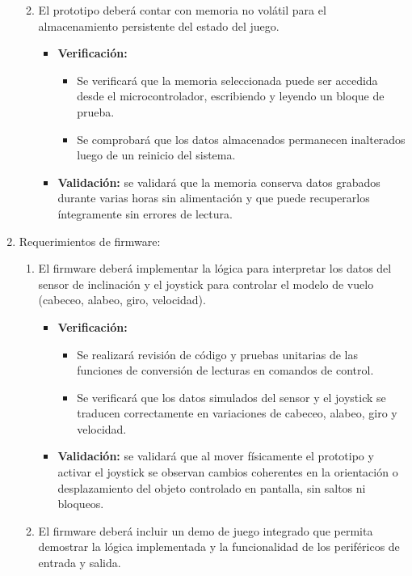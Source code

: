 \documentclass[
11pt, %
]{charter}
\begin{document}
\begin{enumerate}
\begin{enumerate}
\begin{itemize}
		\end{itemize}		
		\item El prototipo deberá contar con memoria no volátil para el almacenamiento persistente del estado del juego. %
		\begin{itemize}
			\item \textbf{Verificación:} 
			\begin{itemize}
				\item Se verificará que la memoria seleccionada puede ser accedida desde el microcontrolador, escribiendo y leyendo un bloque de prueba.                                     
				\item Se comprobará que los datos almacenados permanecen inalterados luego de un reinicio del sistema.
			\end{itemize}
			\item \textbf{Validación:} se validará que la memoria conserva datos grabados durante varias horas sin alimentación y que puede recuperarlos íntegramente sin errores de lectura.
		\end{itemize}	
	\end{enumerate}
	\item Requerimientos de firmware:
	\begin{enumerate}
		\item El firmware deberá implementar la lógica para interpretar los datos del sensor de inclinación y el joystick para controlar el modelo de vuelo (cabeceo, alabeo, giro, velocidad). %
		\begin{itemize}
			\item \textbf{Verificación:} 
			\begin{itemize}
				\item Se realizará revisión de código y pruebas unitarias de las funciones de conversión de lecturas en comandos de control.
				\item Se verificará que los datos simulados del sensor y el joystick se traducen correctamente en variaciones de cabeceo, alabeo, giro y velocidad.
			\end{itemize} 
			\item \textbf{Validación:} se validará que al mover físicamente el prototipo y activar el joystick se observan cambios coherentes en la orientación o desplazamiento del objeto controlado en pantalla, sin saltos ni bloqueos.
		\end{itemize}
		\item El firmware deberá incluir un demo de juego integrado que permita demostrar la lógica implementada y la funcionalidad de los periféricos de entrada y salida. %

\end{enumerate}
\end{enumerate}
\end{document}
